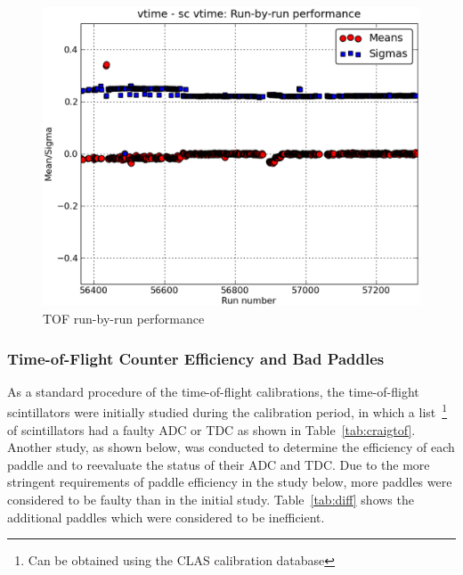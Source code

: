 \begin{figure}\begin{center}
    \includegraphics[width=.40\linewidth]{figures/calib/tof/Tof_runscan_p0v7.eps}
    \caption{TOF run-by-run performance}
    \label{plt:tofrunbyrun}
\end{center}\end{figure}

\subsubsection{\label{sec:calib.tof.eff}Time-of-Flight Counter Efficiency and Bad Paddles}

As a standard procedure of the time-of-flight calibrations, the time-of-flight scintillators were initially studied during the calibration period, in which a list~\footnote{Can be obtained using the CLAS calibration database} of scintillators had a faulty ADC or TDC as shown in Table~\ref{tab:craigtof}. Another study, as shown below, was conducted to determine the efficiency of each paddle and to reevaluate the status of their ADC and TDC. Due to the more stringent requirements of paddle efficiency in the study below, more paddles were considered to be faulty than in the initial study. Table~\ref{tab:diff} shows the additional paddles which were considered to be inefficient.

